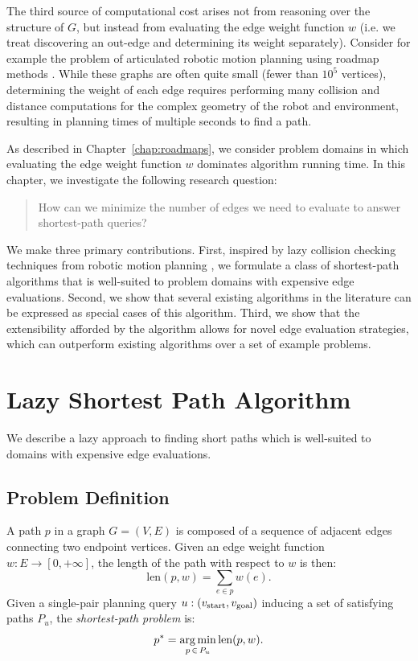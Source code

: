 The third source of computational cost arises not from reasoning
over the structure of $G$,
but instead from evaluating the edge weight function $w$
(i.e. we treat discovering an out-edge and determining its weight
separately).
Consider for example the problem of articulated robotic motion planning
using roadmap methods \citep{kavrakietal1996prm}.
While these graphs are often quite small
(fewer than $10^5$ vertices),
determining the weight of each edge requires performing many
collision and distance computations for the complex geometry
of the robot and environment,
resulting in planning times of multiple seconds to find a path.

As described in Chapter~\ref{chap:roadmaps},
we consider problem domains in which evaluating the edge weight
function $w$ dominates algorithm running time.
In this chapter,
we investigate the following research question:
\begin{quote}
How can we minimize the number of edges we need to evaluate
to answer shortest-path queries?
\end{quote}

We make three primary contributions.
First,
inspired by lazy collision checking techniques from 
robotic motion planning \citep{bohlin2000lazyprm},
we formulate a class of shortest-path algorithms 
that is well-suited to problem domains with expensive edge evaluations.
Second,
we show that several existing algorithms in the literature
can be expressed as special cases of this algorithm.
Third,
we show that the extensibility afforded by the algorithm allows for
novel edge evaluation strategies,
which can outperform existing algorithms
over a set of example problems.

\section{Lazy Shortest Path Algorithm}

We describe a lazy approach to finding short paths
which is well-suited to domains with
expensive edge evaluations.

\subsection{Problem Definition}

A path $p$ in a graph $G = (V,E)$
is composed of a sequence of adjacent edges 
connecting two endpoint vertices.
Given an edge weight function
$w : E \rightarrow [0,+\infty]$,
the length of the path with respect to $w$ is then:
\begin{equation}
   \mbox{len}(p, w) = \sum_{e \in p} w(e).
   \label{eqn:lazysp:len-definition}
\end{equation}
Given a single-pair planning query
$u: (v_{\mbox{\scriptsize start}}, v_{\mbox{\scriptsize goal}})$
inducing a set of satisfying paths $P_u$,
the \emph{shortest-path problem} is:
\begin{equation}
   p^* = \operatorname*{arg\,min}_{p \, \in \, P_u} \mbox{len}(p, w).
   \label{eqn:objective}
\end{equation}


